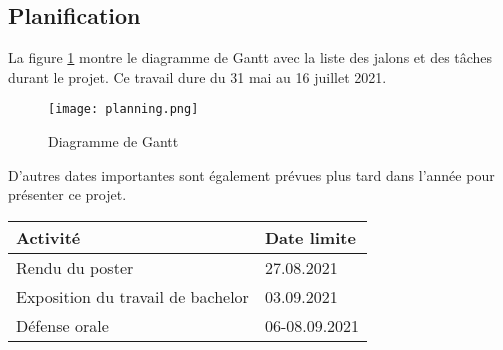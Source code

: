 \begin{landscape}
\section{Planification}
La figure \ref{fig:gantt} montre le diagramme de Gantt avec la liste des jalons et des tâches durant le projet. Ce travail dure du 31 mai au 16 juillet 2021.
\begin{figure}[h!]
   \centering
    \texttt{[image: planning.png]}
    \caption{Diagramme de Gantt}
    \label{fig:gantt}
\end{figure}

D'autres dates importantes sont également prévues plus tard dans l'année pour présenter ce projet.

\begin{table}[ht]
    \begin{tabularx}{\columnwidth}{ | X | p{8em} |}
        \hline
        \textbf{Activité} & \textbf{Date limite} \\
        \hline
        Rendu du poster & 27.08.2021 \\
        Exposition du travail de bachelor & 03.09.2021 \\
        Défense orale & 06-08.09.2021 \\
        \hline
    \end{tabularx}
\end{table}

\end{landscape} 